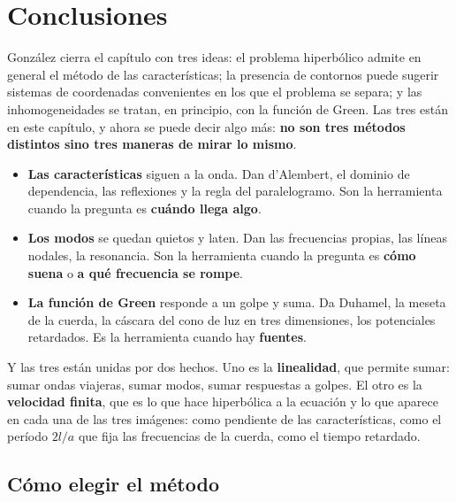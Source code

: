 \documentclass[
  spanish,
  a4paper,
]{scrbook}
\providecommand{\tightlist}{%
  \setlength{\itemsep}{0pt}\setlength{\parskip}{0pt}}
\theoremstyle{definition}
\theoremstyle{plain}
\theoremstyle{definition}
\theoremstyle{plain}
\theoremstyle{definition}
\theoremstyle{remark}
\begin{document}
\section{Conclusiones}\label{sec-hip-conclusiones}

González cierra el capítulo con tres ideas: el problema hiperbólico
admite en general el método de las características; la presencia de
contornos puede sugerir sistemas de coordenadas convenientes en los que
el problema se separa; y las inhomogeneidades se tratan, en principio,
con la función de Green. Las tres están en este capítulo, y ahora se
puede decir algo más: \textbf{no son tres métodos distintos sino tres
maneras de mirar lo mismo}.

\begin{itemize}
\tightlist
\item
  \textbf{Las características} siguen a la onda. Dan d'Alembert, el
  dominio de dependencia, las reflexiones y la regla del paralelogramo.
  Son la herramienta cuando la pregunta es \textbf{cuándo llega algo}.
\item
  \textbf{Los modos} se quedan quietos y laten. Dan las frecuencias
  propias, las líneas nodales, la resonancia. Son la herramienta cuando
  la pregunta es \textbf{cómo suena} o \textbf{a qué frecuencia se
  rompe}.
\item
  \textbf{La función de Green} responde a un golpe y suma. Da Duhamel,
  la meseta de la cuerda, la cáscara del cono de luz en tres
  dimensiones, los potenciales retardados. Es la herramienta cuando hay
  \textbf{fuentes}.
\end{itemize}

Y las tres están unidas por dos hechos. Uno es la \textbf{linealidad},
que permite sumar: sumar ondas viajeras, sumar modos, sumar respuestas a
golpes. El otro es la \textbf{velocidad finita}, que es lo que hace
hiperbólica a la ecuación y lo que aparece en cada una de las tres
imágenes: como pendiente de las características, como el período
\(2l/a\) que fija las frecuencias de la cuerda, como el tiempo
retardado.

\subsection{Cómo elegir el método}\label{sec-hip-elegir}
\end{document}
